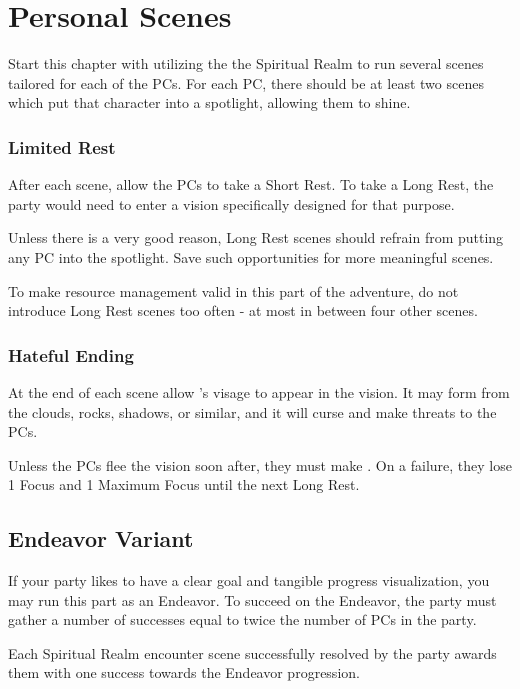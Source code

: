 \section{Personal Scenes}
\label{sec:personalScenes}

Start this chapter with utilizing the the Spiritual Realm to run several scenes tailored for each of the PCs. For each PC, there should be at least two scenes which put that character into a spotlight, allowing them to shine.

\subsubsection{Limited Rest}

After each scene, allow the PCs to take a Short Rest. To take a Long Rest, the party would need to enter a vision specifically designed for that purpose.

Unless there is a very good reason, Long Rest scenes should refrain from putting any PC into the spotlight. Save such opportunities for more meaningful scenes.

To make resource management valid in this part of the adventure, do not introduce Long Rest scenes too often - at most in between four other scenes.

\subsubsection{Hateful Ending}

At the end of each scene allow \npcMishram{}'s visage to appear in the vision. It may form from the clouds, rocks, shadows, or similar, and it will curse and make threats to the PCs.

Unless the PCs flee the vision soon after, they must make . On a failure, they lose 1 Focus and 1 Maximum Focus until the next Long Rest.



\subsection{Endeavor Variant}

If your party likes to have a clear goal and tangible progress visualization, you may run this part as an Endeavor. To succeed on the Endeavor, the party must gather a number of successes equal to twice the number of PCs in the party.

Each Spiritual Realm encounter scene successfully resolved by the party awards them with one success towards the Endeavor progression.

